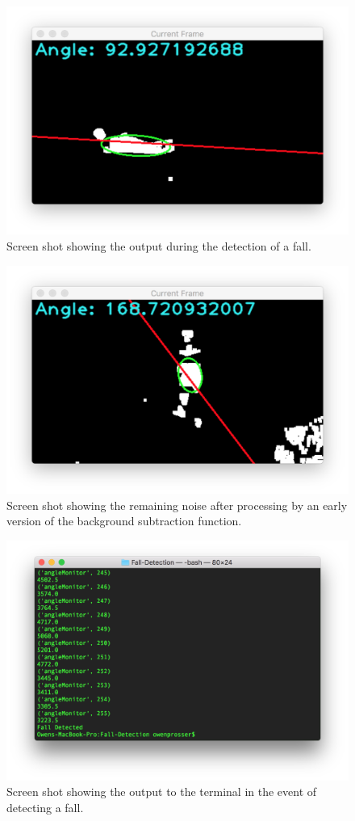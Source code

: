 \documentclass[11pt,a4paper]{report}
\begin{document}
\begin{figure}[H]
 \centering
 \includegraphics[scale = 0.6]{fallDetected.png}
 \caption[Fall Detection]{Screen shot showing the output during the detection of a fall.}
 \label{fig:fallDetected}
\end{figure}

\begin{figure}[H]
 \centering
 \includegraphics[scale = 0.6]{bgSubNoise.png}
 \caption[Original Background Subtraction]{Screen shot showing the remaining noise after processing by an early version of the background subtraction function.}
 \label{fig:bgSubNoise}
\end{figure}

\begin{figure}[H]
 \centering
 \includegraphics[scale = 0.5]{fallDetectedOutput.png}
 \caption[Bash Terminal Output]{Screen shot showing the output to the terminal in the event of detecting a fall.}
 \label{fig:fallDetectedOutput}
\end{figure}
\end{document}
